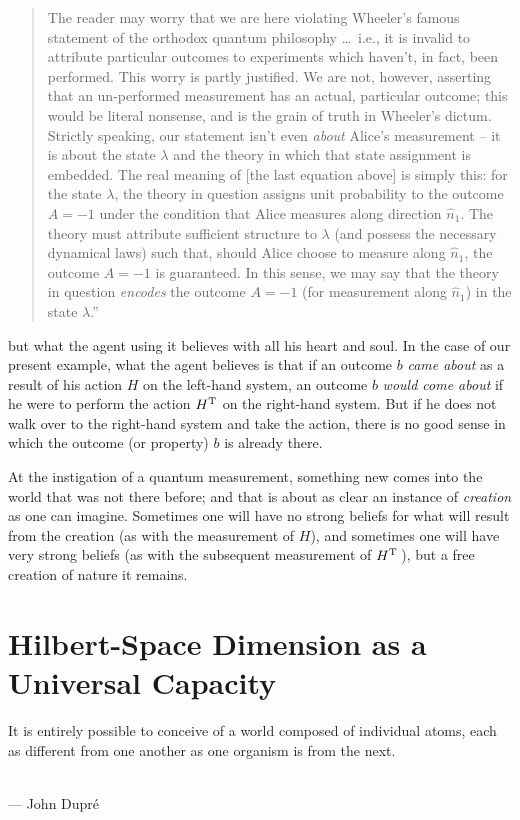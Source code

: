 {\begin{quotation}
The reader may worry that we are here violating Wheeler's famous statement of the orthodox quantum philosophy \ldots\ i.e., it is invalid to attribute particular outcomes to experiments which haven't, in fact, been performed. This worry is partly justified. We are not, however, asserting
that an un-performed measurement has an actual, particular outcome; this would be literal nonsense, and is the grain of truth in Wheeler's dictum. Strictly speaking, our statement isn't even {\it about\/} Alice's measurement -- it is about the state $\lambda$ and the theory in which that state
assignment is embedded. The real meaning of [the last equation above] is simply this: for the state $\lambda$, the theory in question assigns
unit probability to the outcome $A = -1$ under the condition that Alice measures along direction $\hat{n}_1$. The theory must attribute sufficient structure to $\lambda$ (and possess the necessary dynamical laws) such that, should Alice choose to measure along $\hat{n}_1$, the outcome $A = -1$ is guaranteed. In this sense, we may say that the theory in question {\it encodes\/} the outcome $A = -1$ (for measurement along $\hat{n}_1$) in the state $\lambda$.''\end{quotation}} but what the agent using it believes with all his heart and soul.  In the case of our present example, what the agent believes is that if an outcome $b$ {\it came about\/} as a result of his action $H$ on the left-hand system, an outcome $b$ {\it would come about\/} if he were to perform the action $H^{\rm\small T}$ on the right-hand system.  But if he does not walk over to the right-hand system and take the action, there is no good sense in which the outcome (or property) $b$ is already there.

At the instigation of a quantum measurement, something new comes into the world that was not there before; and that is about as clear an instance of {\it creation\/} as one can imagine.  Sometimes one will have no strong beliefs for what will result from the creation (as with the measurement of $H$), and sometimes one will have very strong beliefs (as with the subsequent measurement of $H^{\rm\small T}\,$), but a free creation of nature it remains.

\section{Hilbert-Space Dimension as a Universal Capacity}

\label{HSpaceDim}

\begin{flushright}
\baselineskip=13pt
\parbox{2.8in}{\baselineskip=13pt\small
It is entirely possible to conceive of a world composed of individual atoms, each as different from one another as one organism is from the next.}
\medskip\\
\small --- John Dupr\'e
\end{flushright}

